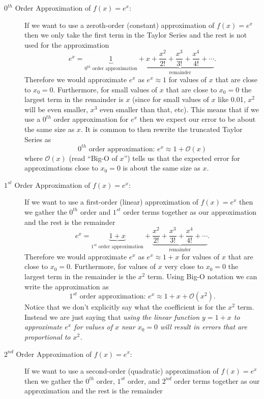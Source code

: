 \documentclass[
]{book}
\theoremstyle{definition}
\theoremstyle{definition}
\theoremstyle{definition}
\theoremstyle{remark}
\begin{document}
\begin{description}
\item[\(0^{th}\) Order Approximation of \(f(x) = e^x\):]
If we want to use a zeroth-order (constant) approximation of \(f(x) = e^x\) then we only take the first term in the Taylor Series and the rest is not used for the approximation
\[ e^x = \underbrace{1}_{\text{$0^{th}$ order approximation}} + \underbrace{x + \frac{x^2}{2!} + \frac{x^3}{3!} + \frac{x^4}{4!} + \cdots}_{\text{remainder}}. \]
Therefore we would approximate \(e^x\) as \(e^x \approx 1\) for values of \(x\) that are close to \(x_0 = 0\). Furthermore, for small values of \(x\) that are close to \(x_0 = 0\) the largest term in the remainder is \(x\) (since for small values of \(x\) like 0.01, \(x^2\) will be even smaller, \(x^3\) even smaller than that, etc). This means that if we use a \(0^{th}\) order approximation for \(e^x\) then we expect our error to be about the same size as \(x\). It is common to then rewrite the truncated Taylor Series as
\[ \text{$0^{th}$ order approximation: } e^x \approx 1 + \mathcal{O}(x) \]
where \(\mathcal{O}(x)\) (read ``Big-O of \(x\)'') tells us that the expected error for approximations close to \(x_0 = 0\) is about the same size as \(x\).
\item[\(1^{st}\) Order Approximation of \(f(x) = e^x\):]
If we want to use a first-order (linear) approximation of \(f(x) = e^x\) then we gather the \(0^{th}\) order and \(1^{st}\) order terms together as our approximation and the rest is the remainder
\[ e^x = \underbrace{1 + x}_{\text{$1^{st}$ order approximation}} + \underbrace{\frac{x^2}{2!} + \frac{x^3}{3!} + \frac{x^4}{4!} + \cdots}_{\text{remainder}}. \]
Therefore we would approximate \(e^x\) as \(e^x \approx 1+x\) for values of \(x\) that are close to \(x_0 = 0\). Furthermore, for values of \(x\) very close to \(x_0 = 0\) the largest term in the remainder is the \(x^2\) term. Using Big-O notation we can write the approximation as
\[ \text{$1^{st}$ order approximation: } e^x \approx 1 + x + \mathcal{O}(x^2). \]
Notice that we don't explicitly say what the coefficient is for the \(x^2\) term. Instead we are just saying that \emph{using the linear function \(y=1+x\) to approximate \(e^x\) for values of \(x\) near \(x_0=0\) will result in errors that are proportional to \(x^2\).}
\item[\(2^{nd}\) Order Approximation of \(f(x) = e^x\):]
If we want to use a second-order (quadratic) approximation of \(f(x) = e^x\) then we gather the \(0^{th}\) order, \(1^{st}\) order, and \(2^{nd}\) order terms together as our approximation and the rest is the remainder

\end{description}
\end{document}
